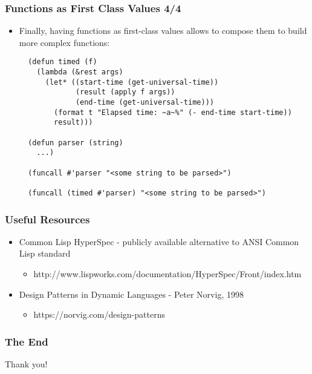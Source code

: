 \documentclass{beamer}
\begin{document}
\begin{frame}[fragile]
  \frametitle{Functions as First Class Values 4/4}
  \begin{itemize}
  \item Finally, having functions as first-class values allows to compose them
    to build more complex functions:
\begin{verbatim}
  (defun timed (f)
    (lambda (&rest args)
      (let* ((start-time (get-universal-time))
             (result (apply f args))
             (end-time (get-universal-time)))
        (format t "Elapsed time: ~a~%" (- end-time start-time))
        result)))

  (defun parser (string)
    ...)

  (funcall #'parser "<some string to be parsed>")

  (funcall (timed #'parser) "<some string to be parsed>")
\end{verbatim}
  \end{itemize}
\end{frame}

\begin{frame}
  \frametitle{Useful Resources}
  \begin{itemize}
  \item Common Lisp HyperSpec - publicly available alternative to ANSI Common
    Lisp standard
    \begin{itemize}
    \item \scriptsize{http://www.lispworks.com/documentation/HyperSpec/Front/index.htm}
    \end{itemize}
  \item Design Patterns in Dynamic Languages - Peter Norvig, 1998
    \begin{itemize}
    \item \scriptsize{https://norvig.com/design-patterns}
    \end{itemize}
  \end{itemize}
\end{frame}

\begin{frame}
  \frametitle{The End}
  \begin{center}
    Thank you!
  \end{center}
\end{frame}
\end{document}

